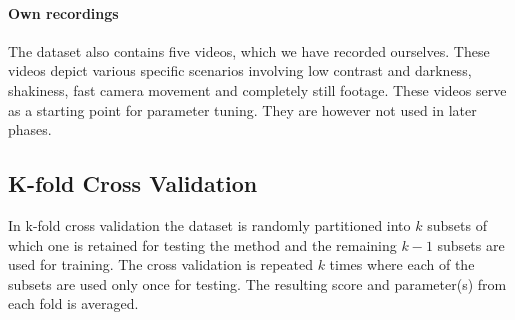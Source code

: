 \paragraph{Own recordings}
%
The dataset also contains five videos, which we have recorded ourselves. These videos depict various specific scenarios involving low contrast and darkness, shakiness, fast camera movement and completely still footage. These videos serve as a starting point for parameter tuning. They are however not used in later phases.
%
\subsection{K-fold Cross Validation}\label{sec:kfoldxval}
%
 In k-fold cross validation the dataset is randomly partitioned into $k$ subsets of which one is retained for testing the method and the remaining $k-1$ subsets are used for training. The cross validation is repeated $k$ times where each of the subsets are used only once for testing. The resulting score and parameter(s) from each fold is averaged. %
%
%
